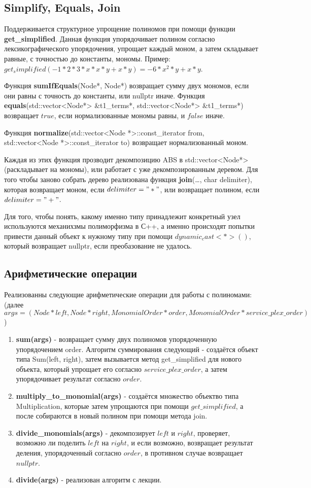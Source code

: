 \documentclass{article}
\begin{document}
\subsection{Simplify, Equals, Join}
Поддерживается структурное упрощение полиномов при помощи функции \textbf{get\_simplified}.
Данная функция упорядочивает полином согласно лексикографического упорядочения, упрощает каждый моном,
а затем складывает равные, с точностью до константы, мономы.
Пример: $get_simplified(-1*2*3*x*x*y + x*y) = -6*x^2*y+x*y$.

Функция \textbf{sumIfEquals}(Node*, Node*) возвращает сумму двух мономов, если они равны с точность до константы, или nullptr иначе.
Функция \textbf{equals}(std::vector<Node*> \&t1\_terms*, std::vector<Node*> \&t1\_terms*) возвращает $true$, если нормализованные мономы равны, и $false$ иначе.

Функция \textbf{normalize}(std::vector<Node *>::const\_iterator from, std::vector<Node *>::const\_iterator to) возвращает нормализованный моном.

Каждая из этих функция прозводит декомпозицию ABS в std::vector<Node*>(раскладывает на мономы), или работает с уже декомпозированным деревом.
Для того чтобы заново собрать дерево реализована функция \textbf{join}(\ldots, char delimiter), которая возвращает моном, если $delimiter="*"$,
или возвращает полином, если $delimiter="+"$. 

Для того, чтобы понять, какому именно типу принадлежит конкретный узел используются механихзмы полиморфизма в С++, а именно
происходят попытки привести данный объект к нужному типу при помощи $dynamic_cast<*>()$, который возвращает nullptr, если преобазование не удалось.

\subsection{Арифметические операции}
Реализованны следующие арифметические операции для работы с полиномами:
(далее $args=(Node* left, Node* right, MonomialOrder *order, MonomialOrder *service\_plex\_order)$)
\begin{enumerate}
    \item \textbf{sum(args)} - возвращает сумму двух полиномов упорядоченную упорядочением order.
    Алгоритм суммирования следующий - создаётся объект типа Sum(left, right), затем вызывается метод get\_simplified для нового объекта,
    который упрощает его согласно $service\_plex\_order$, а затем упорядочивает результат согласно $order$.
    \item \textbf{multiply\_to\_monomial(args)} - создаётся множество объектво типа Multiplication, которые затем упрощаются при помощи
    $get\_simplified$, а после собираются в новый полином при помощи метода join.
    \item \textbf{divide\_monomials(args)} - декомпозирует $left$ и $right$, проверяет, возможно ли поделить $left$ на $right$, и 
    если возможно, возвращает результат деления, упорядоченный согласно $order$, в противном случае возвращает $nullptr$.
    \item \textbf{divide(args)} - реализован алгоритм с лекции.
\end{enumerate}
\newpage
\end{document}
